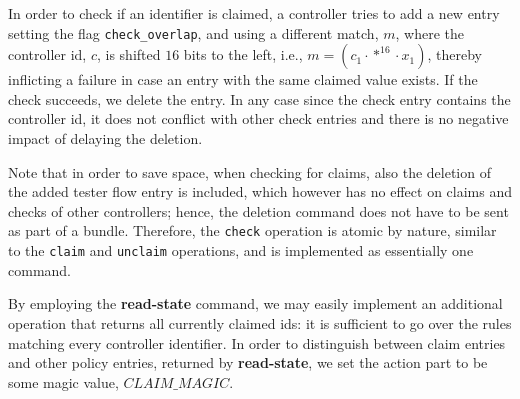 \documentclass[conference]{sigcomm-alternate}
\newcommand{\concat}[0]{\cdot}
\newcommand{\claimcheck}{check\xspace}
\newcommand{\checko}{\texttt{check\_overlap}\xspace}
\newcommand{\claimmagic}{\textit{CLAIM\_MAGIC}}
\begin{document}
In order to check if an identifier is claimed, a controller tries to add
a new entry setting the flag \texttt{\checko}, and using a different
match, $m$, where the controller id, $c$, is shifted $16$ bits to the left, i.e., $m=( c_1\concat *^{16}\concat x_1)$,
thereby inflicting a failure in case an entry with the same claimed value exists.
If the check succeeds, we delete the entry. In any case since the check entry contains the controller id, it does not conflict with other check entries and there is no negative impact of delaying the deletion.

Note that in order to save space, when checking for claims, also the deletion of the added tester flow entry is included,
which however has no effect on claims and checks of other controllers; hence, the deletion command does not
have to be sent as part of a bundle. Therefore, the \texttt{\claimcheck} operation is atomic by nature,
similar to the \texttt{claim} and \texttt{unclaim} operations, and is
implemented as essentially one command.

By employing the \textbf{read-state} command, we may easily implement
an additional operation that returns all currently claimed ids: it is
sufficient to go over the rules matching every controller identifier.
In order to distinguish between claim entries and other policy entries, returned by  \textbf{read-state}, we set the action part to be some magic value, $\claimmagic$.
\end{document}
